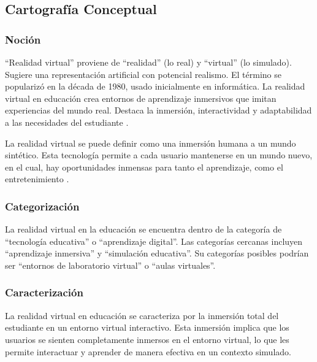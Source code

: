 \subsection{Cartografía Conceptual}

\subsubsection{Noción}

“Realidad virtual” proviene de “realidad” (lo real) y “virtual” (lo simulado). Sugiere una representación artificial con potencial realismo. El término se popularizó en la década de 1980, usado inicialmente en informática. La realidad virtual en educación crea entornos de aprendizaje inmersivos que imitan experiencias del mundo real. Destaca la inmersión, interactividad y adaptabilidad a las necesidades del estudiante \parencite{zheng1998virtual}.

La realidad virtual se puede definir como una inmersi{\'o}n humana a un mundo sint{\'e}tico. Esta tecnolog{\'i}a permite a cada usuario mantenerse en un mundo nuevo, en el cual, hay oportunidades inmensas para tanto el aprendizaje, como el entretenimiento \parencite{elmqaddem2019augmented}.
\subsubsection{Categorización}

La realidad virtual en la educación se encuentra dentro de la categoría de “tecnología educativa” o “aprendizaje digital”. Las categorías cercanas incluyen “aprendizaje inmersiva” y “simulación educativa”. Su categorías posibles podrían ser “entornos de laboratorio virtual” o “aulas virtuales”. \parencite{barahona2019cospaces, marin2022realidad}

\subsubsection{Caracterización}

La realidad virtual en educación se caracteriza por la inmersión total del estudiante en un entorno virtual interactivo. Esta inmersión implica que los usuarios se sienten completamente inmersos en el entorno virtual, lo que les permite interactuar y aprender de manera efectiva en un contexto simulado. \parencite{zamudio2021realidad}



